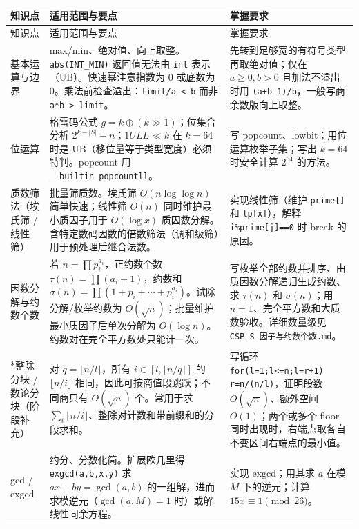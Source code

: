 \documentclass[a4paper,11pt]{article}
\newcommand{\code}[1]{\texttt{#1}}
\renewcommand{\arraystretch}{1.12}
\begin{document}
\begingroup
\small
\renewcommand{\arraystretch}{1.04}
\begin{longtable}{L{2.4cm} L{7.5cm} L{6.8cm}}
\toprule
知识点 & 适用范围与要点 & 掌握要求 \\
\midrule
\endfirsthead
\toprule
知识点 & 适用范围与要点 & 掌握要求 \\
\midrule
\endhead
\endfoot
\bottomrule
\endlastfoot

基本运算与边界
& max/min、绝对值、向上取整。\code{abs(INT\_MIN)} 返回值无法由 \code{int} 表示（UB）。快速幂注意指数为 0 或底数为 0。乘法前检查溢出：\code{limit/a < b} 而非 \code{a*b > limit}。
& 先转到足够宽的有符号类型再取绝对值；仅在 $a\ge0,b>0$ 且加法不溢出时用 \code{(a+b-1)/b}，一般写商余数版向上取整。\\[2mm]

位运算
& 格雷码公式 $g=k\oplus(k\gg1)$；位集合分析 $2^{k-|S|}-n$；$1ULL\ll k$ 在 $k=64$ 时是 UB（移位量等于类型宽度）必须特判。popcount 用 \code{\_\_builtin\_popcountll}。
& 写 popcount、lowbit；用位运算枚举子集；写出 $k=64$ 时安全计算 $2^{64}$ 的方法。\\[2mm]

质数筛法（埃氏筛 / 线性筛）
& 批量筛质数。埃氏筛 $O(n\log\log n)$ 简单快速；线性筛 $O(n)$ 同时维护最小质因子用于 $O(\log x)$ 质因数分解。含特定数码因数的倍数筛法（调和级筛）用于预处理后继合法数。
& 实现线性筛（维护 \code{prime[]} 和 \code{lp[x]}），解释 \code{i\%prime[j]==0} 时 break 的原因。\\[2mm]

因数分解与约数个数
& 若 $n=\prod p_i^{a_i}$，正约数个数 $\tau(n)=\prod(a_i+1)$，约数和 $\sigma(n)=\prod(1+p_i+\cdots+p_i^{a_i})$。试除分解/枚举约数为 $O(\sqrt n)$；批量维护最小质因子后单次分解为 $O(\log n)$。约数对在完全平方数处只能计一次。
& 写枚举全部约数并排序、由质因数分解递归生成约数、求 $\tau(n)$ 和 $\sigma(n)$；用 $n=1$、完全平方数和大质数验收。详细数量级见 \code{CSP-S-因子与约数个数.md}。\\[2mm]

*整除分块 / 数论分块（阶段补充）
& 对 $q=\lfloor n/l\rfloor$，所有 $i\in[l,\lfloor n/q\rfloor]$ 的 $\lfloor n/i\rfloor$ 相同，因此可按商值段跳跃；不同商只有 $O(\sqrt n)$ 个。常用于求 $\sum_i\lfloor n/i\rfloor$、整除对计数和带前缀和的分段求和。
& 写循环 \code{for(l=1;l<=n;l=r+1) r=n/(n/l)}，证明段数 $O(\sqrt n)$、额外空间 $O(1)$；两个或多个 floor 同时出现时，右端点取各自不变区间右端点的最小值。\\[2mm]

gcd / exgcd
& 约分、分数化简。扩展欧几里得 \code{exgcd(a,b,x,y)} 求 $ax+by=\gcd(a,b)$ 的一组解，进而求模逆元（$\gcd(a,M)=1$ 时）或解线性同余方程。
& 实现 exgcd；用其求 $a$ 在模 $M$ 下的逆元；计算 $15x\equiv1\pmod{26}$。\\[2mm]


\end{longtable}
\end{document}
